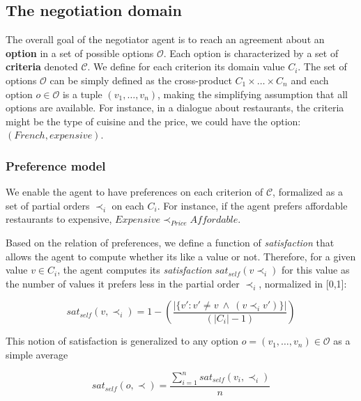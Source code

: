 \documentclass[runningheads,a4paper]{llncs}
\begin{document}
	\subsection{The negotiation domain}
	
	The overall goal of the negotiator agent is to reach an agreement about an \textbf{option} in a set of possible options $\mathcal{O}$. 
	Each option is characterized by a set of \textbf{criteria} denoted $\mathcal{C}$. We define for each criterion its domain value $C_i$.
	The set of options $\mathcal{O}$ can be simply defined as the cross-product $C_1\times\ldots\times C_n$ and each option $o\in\mathcal{O}$ is a tuple $(v_1,\ldots,v_n)$, making the simplifying assumption that all options are available. For instance, in a dialogue about restaurants, the criteria might be the type of cuisine and the price, we could have the option: $(French,expensive)$.
	
	\subsubsection{Preference model} 
	We enable the agent to have preferences on each criterion of $\mathcal{C}$, formalized as a set of partial orders $\prec_i$ on each $C_i$. For instance, if the agent prefers affordable restaurants to expensive, $Expensive\prec_{Price}Affordable$.
	
	Based on the relation of preferences, we define a function of \emph{satisfaction} that allows the agent to compute whether its like a value or not. Therefore, for a given value $v\in C_i$, the agent computes its \emph{satisfaction} $sat_{self}(v \prec_i)$ for this value as the number of values it prefers less in the partial order $\prec_i$, normalized in [0,1]:

	\begin{equation}
	sat_{self}(v, \prec_i) =	1 - \left( \frac{|\{v' : v' \neq v \  \wedge \ (v \prec_i v')\}| }{( |C_i| - 1 )}\right)
	\end{equation}
	
	This notion of satisfaction is generalized to any option $o= (v_1, \ldots, v_n)\in \mathcal{O}$ as a simple average

	\begin{equation}
	sat_{self}(o, \prec) = \frac{\sum_{i=1}^{n} sat_{self}(v_i, \prec_i) }{n}
	\end{equation}
	
	
\end{document}
